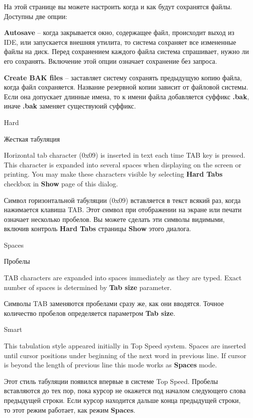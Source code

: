 \else
На этой странице вы можете настроить когда и как будут сохранятся файлы.
Доступны две опции:

{\bf Autosave} -- когда закрывается окно, содержащее файл, происходит выход из
IDE, или запускается внешняя утилита, то система сохраняет все измененные файлы на
диск. Перед сохранением каждого файла система спрашивает, нужно ли его сохранять.
Включение этой опции означает сохранение без запроса.

{\bf Create BAK files} -- заставляет систему сохранять предыдущую копию файла,
когда файл сохраняется. Название резервной копии зависит от файловой системы.
Если она допускает длинные имена, то к имени файла добавляется суффикс {\bf .bak},
иначе {\bf .bak} заменяет существуюий суффикс.
\fi

\begin{popup}
\ifenglish
\caption{Hard}
\else
\caption{Жесткая табуляция}
\fi
{}
\ifenglish
Horizontal tab character (0x09) is inserted in text each time TAB key is pressed.
This character is expanded into several spaces when displaying on the screen or
printing. You may make these characters visible by selecting {\bf Hard Tabs} checkbox
in {\bf Show} page of this dialog.

\else
Символ горизонтальной табуляции (0x09) вставляется в текст всякий раз, когда
нажимается клавиша TAB. Этот символ при отображении на экране или печати означает
несколько пробелов. Вы можете сделать эти символы видимыми, включив контроль
{\bf Hard Tabs} страницы {\bf Show} этого диалога.
\fi
\end{popup}

\begin{popup}
\ifenglish
\caption{Spaces}
\else
\caption{Пробелы}
\fi
{}
\ifenglish
TAB characters are expanded into spaces immediately as they are typed. Exact number
of spaces is determined by {\bf Tab size} parameter.

\else
Символы TAB заменяются пробелами сразу же, как они вводятся. Точное количество
пробелов определяется параметром {\bf Tab size}.
\fi
\end{popup}

\begin{popup}
\caption{Smart}
\ifenglish
This tabulation style appeared initially in Top Speed system.
Spaces are inserted until cursor positions under beginning of the next
word in previous line. If cursor is beyond the length of previous line this
mode works as {\bf Spaces} mode.

\else
Этот стиль табуляции появился впервые в системе Top Speed.
Пробелы вставляются до тех пор, пока курсор не окажется под началом следующего
слова предыдущей строки. Если курсор находится дальше конца предыдущей строки,
то этот режим работает, как режим {\bf Spaces}.
\fi
\end{popup}

